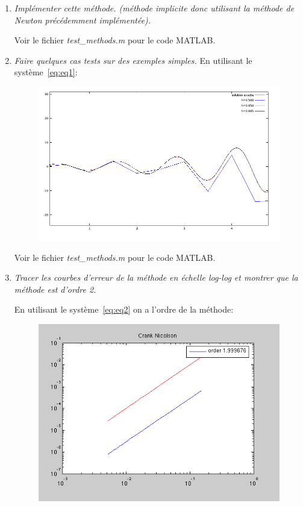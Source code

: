\documentclass[a4paper,10pt]{article}
\begin{document}
\begin{enumerate}
    \item \emph{Implémenter cette méthode. (méthode implicite donc utilisant la
    méthode de Newton précédemment implémentée).}

    Voir le fichier \emph{test\_methods.m} pour le code MATLAB.

    \item \emph{Faire quelques cas tests sur des exemples simples.}
\clearpage
    En utilisant le système~\eqref{eq:eq1}:
\begin{figure}[h!]
    \centering
    \includegraphics[scale=0.6]{./img/step-crank-nicolson.png}
\end{figure}

    Voir le fichier \emph{test\_methods.m} pour le code MATLAB.

    \item \emph{Tracer les courbes d'erreur de la méthode en échelle log-log et montrer
    que la méthode est d'ordre 2.}

    En utilisant le système~\eqref{eq:eq2} on a l'ordre de la méthode:
\begin{figure}[h!]
    \centering
    \includegraphics[scale=0.5]{./img/order-crank-nicolson.png}
\end{figure}


\end{enumerate}
\end{document}
